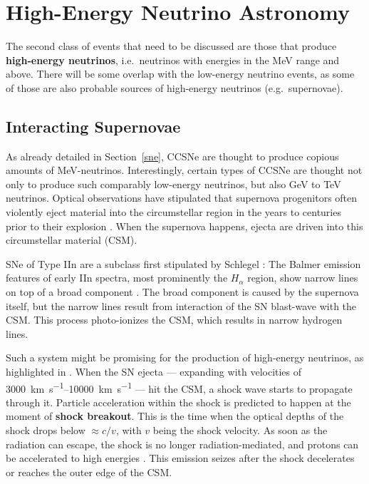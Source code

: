 \section{High-Energy Neutrino Astronomy}\label{he_neutrino_astronomy}

The second class of events that need to be discussed are those that produce \textbf{high-energy neutrinos}, i.e.\ neutrinos with energies in the \unit{\mega\eV} range and above. There will be some overlap with the low-energy neutrino events, as some of those are also probable sources of high-energy neutrinos (e.g.\ supernovae).

\subsection{Interacting Supernovae}\label{interacting_sne}
As already detailed in Section~\ref{sne}, CCSNe are thought to produce copious amounts of \unit{\mega\eV}-neutrinos. Interestingly, certain types of CCSNe are thought not only to produce such comparably low-energy neutrinos, but also \unit{\giga\eV} to \unit{\tera\eV} neutrinos. Optical observations have stipulated that supernova progenitors often violently eject material into the circumstellar region in the years to centuries prior to their explosion . When the supernova happens, ejecta are driven into this circumstellar material (CSM).

SNe of Type IIn are a subclass first stipulated by Schlegel : The Balmer emission features of early IIn spectra, most prominently the $H_\alpha$ region, show narrow lines on top of a broad component . The broad component is caused by the supernova itself, but the narrow lines result from interaction of the SN blast-wave with the CSM\@. This process photo-ionizes the CSM, which results in narrow hydrogen lines.

Such a system might be promising for the production of high-energy neutrinos, as highlighted in . When the SN ejecta --- expanding with velocities of \SIrange{3000}{10000}{\km\per\s} --- hit the CSM, a shock wave starts to propagate through it. Particle acceleration within the shock is predicted to happen at the moment of \textbf{shock breakout}. This is the time when the optical depths of the shock drops below $\approx c/v$, with $v$ being the shock velocity. As soon as the radiation can escape, the shock is no longer radiation-mediated, and protons can be accelerated to high energies . This emission seizes after the shock decelerates or reaches the outer edge of the CSM\@.


